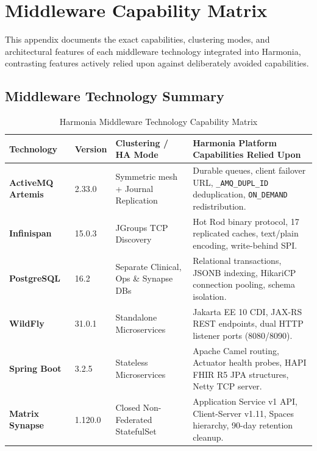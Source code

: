 
\chapter{Middleware Capability Matrix}
\label{app:middleware_matrix}

This appendix documents the exact capabilities, clustering modes, and architectural features of each middleware technology integrated into Harmonia, contrasting features actively relied upon against deliberately avoided capabilities.

\section{Middleware Technology Summary}

\begin{table}[htbp]
\centering
\small
\begin{tabularx}{\textwidth}{l l P{3.4cm} Y}
\toprule
\textbf{Technology} & \textbf{Version} & \textbf{Clustering / HA Mode} & \textbf{Harmonia Platform Capabilities Relied Upon} \\
\midrule
\textbf{ActiveMQ Artemis} & 2.33.0 & Symmetric mesh + Journal Replication & Durable queues, client failover URL, \nolinkurl{_AMQ_DUPL_ID} deduplication, \nolinkurl{ON_DEMAND} redistribution. \\
\addlinespace
\textbf{Infinispan} & 15.0.3 & JGroups TCP Discovery & Hot Rod binary protocol, 17 replicated caches, text/plain encoding, write-behind SPI. \\
\addlinespace
\textbf{PostgreSQL} & 16.2 & Separate Clinical, Ops \& Synapse DBs & Relational transactions, JSONB indexing, HikariCP connection pooling, schema isolation. \\
\addlinespace
\textbf{WildFly} & 31.0.1 & Standalone Microservices & Jakarta EE 10 CDI, JAX-RS REST endpoints, dual HTTP listener ports (8080/8090). \\
\addlinespace
\textbf{Spring Boot} & 3.2.5 & Stateless Microservices & Apache Camel routing, Actuator health probes, HAPI FHIR R5 JPA structures, Netty TCP server. \\
\addlinespace
\textbf{Matrix Synapse} & 1.120.0 & Closed Non-Federated StatefulSet & Application Service v1 API, Client-Server v1.11, Spaces hierarchy, 90-day retention cleanup. \\
\bottomrule
\end{tabularx}
\caption{Harmonia Middleware Technology Capability Matrix}
\label{tab:middleware_capability_matrix}
\end{table}

